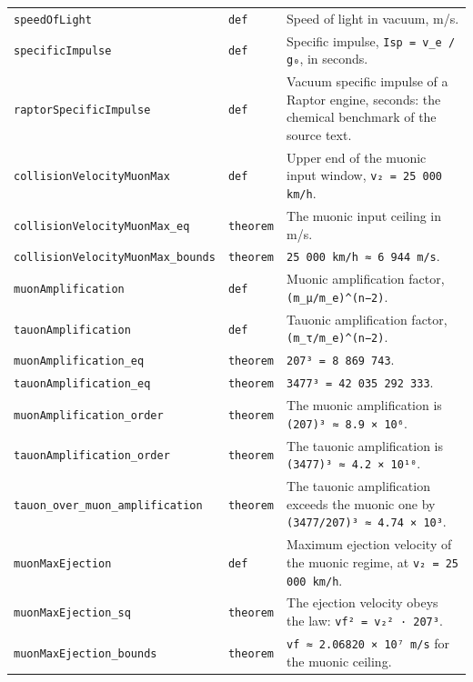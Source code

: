 \documentclass[11pt,a4paper]{article}
\begin{document}
\begin{center}
\begin{longtable}{@{}p{}p{}p{}@{}}
\texttt{speedOfLight} & \texttt{def} & \small Speed of light in vacuum, m/s. \\
\texttt{specificImpulse} & \texttt{def} & \small Specific impulse, \texttt{Isp = v\_\allowbreak{}e / g₀}, in seconds. \\
\texttt{raptorSpecificImpulse} & \texttt{def} & \small Vacuum specific impulse of a Raptor engine, seconds: the chemical benchmark of the source text. \\
\texttt{collisionVelocityMuonMax} & \texttt{def} & \small Upper end of the muonic input window, \texttt{v₂ = 25 000 km/h}. \\
\texttt{collisionVelocityMuonMax\_\allowbreak{}eq} & \texttt{theorem} & \small The muonic input ceiling in m/s. \\
\texttt{collisionVelocityMuonMax\_\allowbreak{}bounds} & \texttt{theorem} & \small \texttt{25 000 km/h ≈ 6 944 m/s}. \\
\texttt{muonAmplification} & \texttt{def} & \small Muonic amplification factor, \texttt{(m\_\allowbreak{}μ/m\_\allowbreak{}e)\textasciicircum{}(n−2)}. \\
\texttt{tauonAmplification} & \texttt{def} & \small Tauonic amplification factor, \texttt{(m\_\allowbreak{}τ/m\_\allowbreak{}e)\textasciicircum{}(n−2)}. \\
\texttt{muonAmplification\_\allowbreak{}eq} & \texttt{theorem} & \small \texttt{207³ = 8 869 743}. \\
\texttt{tauonAmplification\_\allowbreak{}eq} & \texttt{theorem} & \small \texttt{3477³ = 42 035 292 333}. \\
\texttt{muonAmplification\_\allowbreak{}order} & \texttt{theorem} & \small The muonic amplification is \texttt{(207)³ ≈ 8.9 × 10⁶}. \\
\texttt{tauonAmplification\_\allowbreak{}order} & \texttt{theorem} & \small The tauonic amplification is \texttt{(3477)³ ≈ 4.2 × 10¹⁰}. \\
\texttt{tauon\_\allowbreak{}over\_\allowbreak{}muon\_\allowbreak{}amplification} & \texttt{theorem} & \small The tauonic amplification exceeds the muonic one by \texttt{(3477/207)³ ≈ 4.74 × 10³}. \\
\texttt{muonMaxEjection} & \texttt{def} & \small Maximum ejection velocity of the muonic regime, at \texttt{v₂ = 25 000 km/h}. \\
\texttt{muonMaxEjection\_\allowbreak{}sq} & \texttt{theorem} & \small The ejection velocity obeys the law: \texttt{vf² = v₂² · 207³}. \\
\texttt{muonMaxEjection\_\allowbreak{}bounds} & \texttt{theorem} & \small \texttt{vf ≈ 2.06820 × 10⁷ m/s} for the muonic ceiling. \\

\end{longtable}
\end{center}
\end{document}
